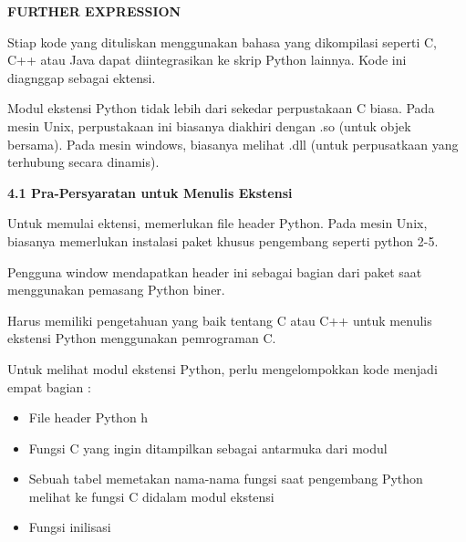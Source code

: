 \begin{center}{\fontsize{14pt}{14pt}\selectfont \textbf{FURTHER EXPRESSION} \\}\end{center} \par
\vspace{14pt}
\noindent 
 \hspace*{0.5in} Stiap kode yang dituliskan menggunakan bahasa yang dikompilasi seperti C, C++ atau Java dapat diintegrasikan ke skrip Python lainnya. Kode ini diagnggap sebagai ektensi. \par
\noindent 
 \hspace*{0.5in} Modul ekstensi Python tidak lebih dari sekedar perpustakaan C biasa. Pada mesin Unix, perpustakaan ini biasanya diakhiri dengan .so (untuk objek bersama). Pada mesin windows, biasanya melihat .dll (untuk perpusatkaan yang terhubung secara dinamis).  \par
\vspace{12pt}
\noindent 
\textbf{4.1 Pra-Persyaratan untuk Menulis Ekstensi} \par
\noindent 
 \hspace*{0.5in} Untuk memulai ektensi, memerlukan file header Python. Pada mesin Unix, biasanya memerlukan instalasi paket khusus pengembang seperti python 2-5. \par
\noindent 
 \hspace*{0.5in} Pengguna window mendapatkan header ini sebagai bagian dari paket saat menggunakan pemasang Python biner. \par
\noindent 
 \hspace*{0.5in} Harus memiliki pengetahuan yang baik tentang C atau C++ untuk menulis ekstensi Python menggunakan pemrograman C. \par
\noindent 
 \hspace*{0.5in} Untuk melihat modul ekstensi Python, perlu mengelompokkan kode menjadi empat bagian : \par
\noindent 
\begin{itemize}
\item File header Python h \par
\noindent 
\item Fungsi C yang ingin ditampilkan sebagai antarmuka dari modul \par
\noindent 
\item Sebuah tabel memetakan nama-nama fungsi saat pengembang Python melihat ke fungsi C didalam modul ekstensi \par
\noindent 
\item Fungsi inilisasi\end{itemize}
